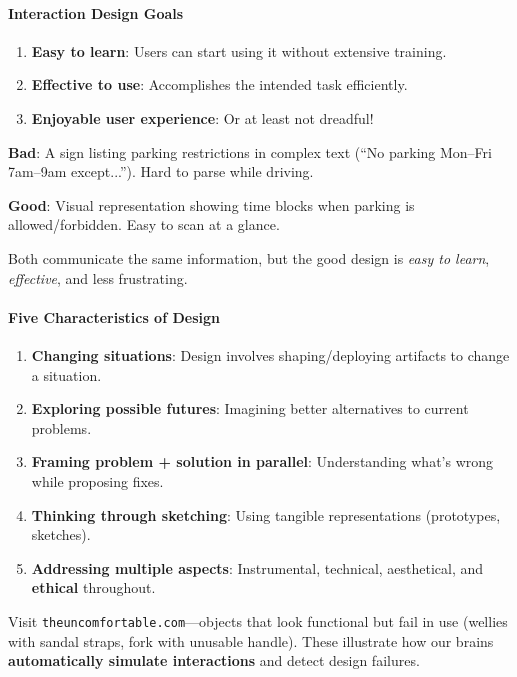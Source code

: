 \paragraph*{Interaction Design Goals}
\begin{enumerate}
  \item \textbf{Easy to learn}: Users can start using it without extensive training.
  \item \textbf{Effective to use}: Accomplishes the intended task efficiently.
  \item \textbf{Enjoyable user experience}: Or at least not dreadful!
\end{enumerate}

\begin{exbox}
\textbf{Bad}: A sign listing parking restrictions in complex text (``No parking Mon--Fri 7am--9am except...''). Hard to parse while driving.

\textbf{Good}: Visual representation showing time blocks when parking is allowed/forbidden. Easy to scan at a glance.

Both communicate the same information, but the good design is \textit{easy to learn}, \textit{effective}, and less frustrating.
\end{exbox}

\paragraph*{Five Characteristics of Design}
\begin{enumerate}
  \item \textbf{Changing situations}: Design involves shaping/deploying artifacts to change a situation.
  \item \textbf{Exploring possible futures}: Imagining better alternatives to current problems.
  \item \textbf{Framing problem + solution in parallel}: Understanding what's wrong while proposing fixes.
  \item \textbf{Thinking through sketching}: Using tangible representations (prototypes, sketches).
  \item \textbf{Addressing multiple aspects}: Instrumental, technical, aesthetical, and \textbf{ethical} throughout.
\end{enumerate}

\begin{tipbox}
Visit \texttt{theuncomfortable.com}---objects that look functional but fail in use (wellies with sandal straps, fork with unusable handle). These illustrate how our brains \textbf{automatically simulate interactions} and detect design failures.
\end{tipbox}


